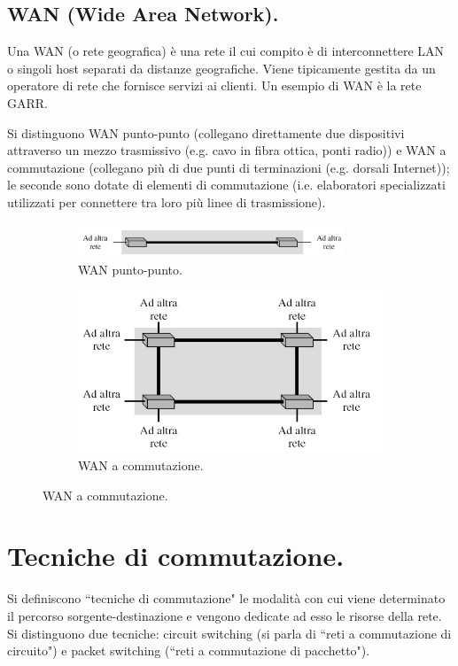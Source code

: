 \documentclass[11pt, italian, openany]{book}
\begin{document}
\begin{sloppypar}
\subsection*{WAN (Wide Area Network).}
Una WAN (o rete geografica) \`e una rete il cui compito \`e di interconnettere LAN o singoli host separati da distanze geografiche. Viene
tipicamente gestita da un operatore di rete che fornisce servizi ai clienti. Un esempio di WAN \`e la rete GARR.
\pagebreak

Si distinguono WAN punto-punto (collegano direttamente due dispositivi attraverso un mezzo trasmissivo (e.g. cavo in fibra ottica, ponti radio))
e WAN a commutazione (collegano pi\`u di due punti di terminazioni (e.g. dorsali Internet)); le seconde sono dotate di elementi di commutazione
(i.e. elaboratori specializzati utilizzati per connettere tra loro pi\`u linee di trasmissione).

\begin{figure}[h!]
	\begin{subfigure}{0.49 \linewidth} \centering
		\includegraphics[width=80mm,height=10mm]{images/wan-puntopunto.png}
		\caption{WAN punto-punto.}
	\end{subfigure}
	\begin{subfigure}{0.49 \linewidth} \centering
		\includegraphics[scale=0.35]{images/wan-commutazione.png}
		\caption{WAN a commutazione.}
	\end{subfigure}
\end{figure}

\section{Tecniche di commutazione.}
Si definiscono ``tecniche di commutazione" le modalit\`a con cui viene determinato il percorso sorgente-destinazione e vengono dedicate ad esso le
risorse della rete. Si distinguono due tecniche: circuit switching (si parla di ``reti a commutazione di circuito") e packet switching (``reti a
commutazione di pacchetto").


\end{sloppypar}
\end{document}
